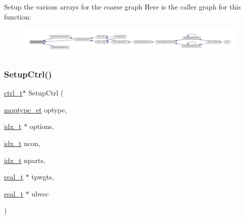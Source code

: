 Setup the various arrays for the coarse graph Here is the caller graph for this function\+:\nopagebreak
\begin{figure}[H]
\begin{center}
\leavevmode
\includegraphics[width=350pt]{a00945_a113522304bf628b09d0b69b4db05050e_icgraph}
\end{center}
\end{figure}
\mbox{\label{a00945_a1420c4ffbe28e4c3349678037adcb918}} 
\subsubsection{\texorpdfstring{Setup\+Ctrl()}{SetupCtrl()}}
{\footnotesize\ttfamily \hyperlink{a00742}{ctrl\+\_\+t}$\ast$ Setup\+Ctrl (\begin{DoxyParamCaption}\item[{\hyperlink{a00876_a64ee21e6d3a57701a812d0903a2f0401}{moptype\+\_\+et}}]{optype,  }\item[{\hyperlink{a00876_aaa5262be3e700770163401acb0150f52}{idx\+\_\+t} $\ast$}]{options,  }\item[{\hyperlink{a00876_aaa5262be3e700770163401acb0150f52}{idx\+\_\+t}}]{ncon,  }\item[{\hyperlink{a00876_aaa5262be3e700770163401acb0150f52}{idx\+\_\+t}}]{nparts,  }\item[{\hyperlink{a00876_a1924a4f6907cc3833213aba1f07fcbe9}{real\+\_\+t} $\ast$}]{tpwgts,  }\item[{\hyperlink{a00876_a1924a4f6907cc3833213aba1f07fcbe9}{real\+\_\+t} $\ast$}]{ubvec }\end{DoxyParamCaption})}

